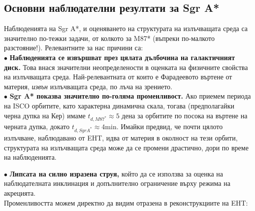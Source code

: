 \subsection{Основни наблюдателни резултати за Sgr A*}

Наблюденията на Sgr A*, и оценяването на структурата на излъчващата среда са значително по-тежки задачи, от колкото за M87* (въпреки по-малкото разстояние!). Релевантните за нас причини са:\\\newline
$\bullet$ \textbf{Наблюденията се извършват през цялата дълбочина на галактичният диск.} Това внася значителни неопределености в оценката на физичните свойства на излъчващата среда. Най-релевантната от които е Фарадеевото въртене от материя, \emph{извън} излъчващата среда, по лъча на зрението.\\\newline
$\bullet$ \textbf{Sgr A* показва значително по-голяма променливост.} Ако приемем периода на ISCO орбитите, като характерна динамична скала, тогава (предполагайки черна дупка на Кер) имаме $t_{d,M87^*} \approx 5 $ дена за орбитите по посока на въртене на черната дупка, докато $t_{d,Sgr A^*}\approx 4 \text{min}$. Имайки предвид, че почти цялото излъчване, наблюдавано от EHT, идва от материя в околност на тези орбити, структурата на излъчващата среда може да се промени драстично, дори по време на наблюденията. \newpage

\noindent$\bullet$ \textbf{Липсата на силно изразена струя,} който да се използва за оценка на наблюдателната инклинация и допълнително ограничение върху режима на акрецията.\\\newline
Променливостта можем директно да видим отразена в реконструкциите на EHT:\\

